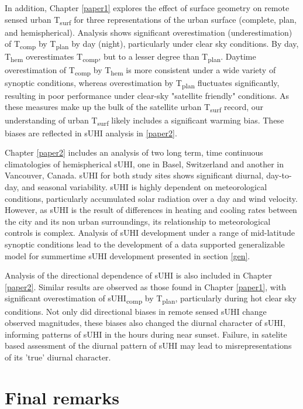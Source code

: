\begin{bibunit}
In addition, Chapter \ref{paper1} explores the effect of surface geometry on remote sensed urban T\textsubscript{surf} for three representations of the urban surface (complete, plan, and hemispherical). Analysis shows significant overestimation (underestimation) of T\textsubscript{comp} by T\textsubscript{plan} by day (night), particularly under clear sky conditions. By day, T\textsubscript{hem} overestimates T\textsubscript{comp}, but to a lesser degree than T\textsubscript{plan}. Daytime overestimation of T\textsubscript{comp} by T\textsubscript{hem} is more consistent under a wide variety of synoptic conditions, whereas overestimation by T\textsubscript{plan} fluctuates significantly, resulting in poor performance under clear-sky "satellite friendly" conditions. As these measures make up the bulk of the satellite urban T\textsubscript{surf} record, our understanding of urban T\textsubscript{surf} likely includes a significant warming bias. These biases are reflected in sUHI analysis in \ref{paper2}.

Chapter \ref{paper2} includes an analysis of two long term, time continuous climatologies of hemispherical sUHI, one in Basel, Switzerland and another in Vancouver, Canada. sUHI for both study sites shows significant diurnal, day-to-day, and seasonal variability. sUHI is highly dependent on meteorological conditions, particularly accumulated solar radiation over a day and wind velocity. However, as sUHI is the result of differences in heating and cooling rates between the city and its non urban surroundings, its relationship to meteorological controls is complex. Analysis of sUHI development under a range of mid-latitude synoptic conditions lead to the development of a data supported generalizable model for summertime sUHI development presented in section \ref{gen}.

Analysis of the directional dependence of sUHI is also included in Chapter \ref{paper2}. Similar results are observed as those found in Chapter \ref{paper1}, with significant overestimation of sUHI\textsubscript{comp} by T\textsubscript{plan}, particularly during hot clear sky conditions. Not only did directional biases in remote sensed sUHI change observed magnitudes, these biases also changed the diurnal character of sUHI, informing patterns of sUHI in the hours during near sunset. Failure, in satelite based assessment of the diurnal pattern of sUHI may lead to misrepresentations of its 'true' diurnal character. 

\section{Final remarks}


\end{bibunit}
